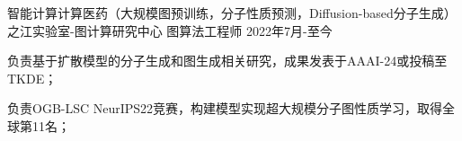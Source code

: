 \begin{cventries}
  \cventry
  {智能计算计算医药（大规模图预训练，分子性质预测，Diffusion-based分子生成）} %
  {之江实验室-图计算研究中心} %
  {图算法工程师} %
  {2022年7月-至今} %
  {
    \begin{cvitems} %
      \item {负责基于扩散模型的分子生成和图生成相关研究，成果发表于AAAI-24或投稿至TKDE；}
      \item {负责OGB-LSC NeurIPS22竞赛，构建模型实现超大规模分子图性质学习，取得全球第11名；}
    \end{cvitems}
  }
\end{cventries}